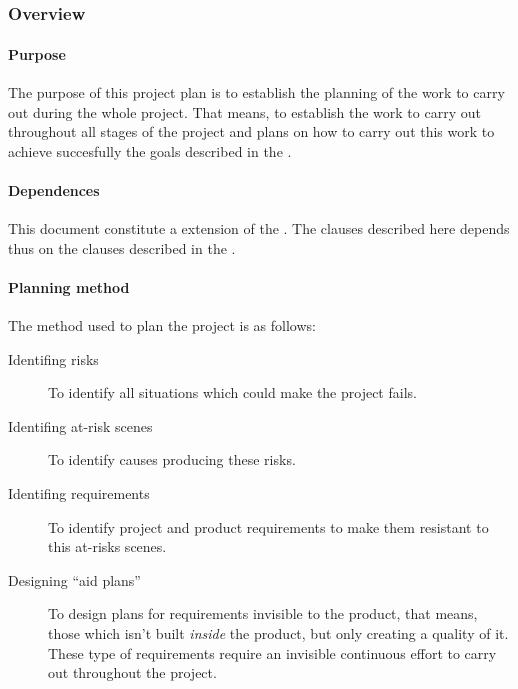 \documentclass[twocolumn]{article}
\begin{document}

\part{\favpl}
\label{part:st0-plan}

\section{Overview}
\subsection{Purpose}
The purpose of this project plan is to establish the planning of the
work to carry out during the whole project. That means, to establish
the work to carry out throughout all stages of the project and plans
on how to carry out this work to achieve succesfully the goals
described in the \favp.

\subsection{Dependences}
This document constitute a extension of the \favc. The clauses
described here depends thus on the clauses described in the \favc.

\subsection{Planning method}
The method used to plan the project is as follows:

\begin{description}
\item[Identifing risks] To identify all situations which could make the
  project fails.
\item[Identifing at-risk scenes] To identify causes producing these risks.
\item[Identifing requirements] To identify project and product
  requirements to make them resistant to this at-risks scenes.
\item[Designing ``aid plans''] To design plans for
  requirements invisible to the product, that means, those which isn't
  built \textit{inside} the product, but only creating a quality of
  it. These type of requirements require an invisible continuous
  effort to carry out throughout the project.
\end{description}
\end{document}
